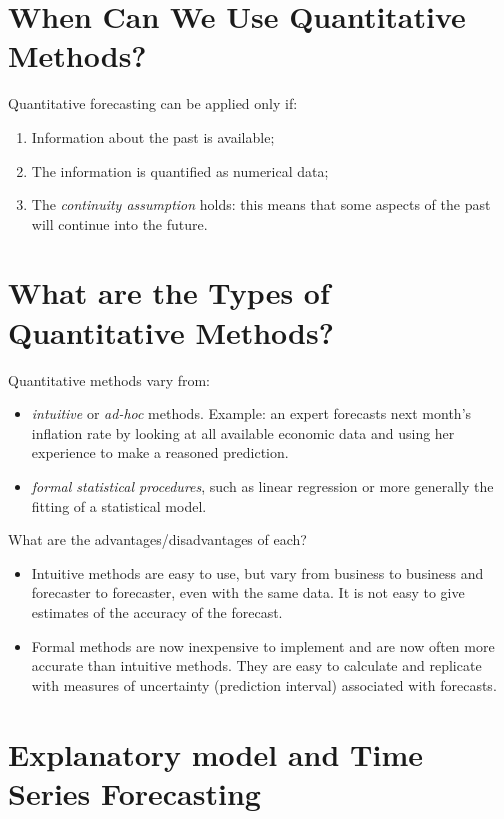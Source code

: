 \documentclass[a4paper,11pt,oneside,onecolumn]{book}
\begin{document}
\vspace{.5cm}

\section{When Can We Use Quantitative Methods?}
\noindent Quantitative forecasting can be applied only if:
\begin{enumerate}
\item Information about the past is available;
\item The information is quantified as numerical data;
\item The {\it continuity assumption} holds: this means that some
aspects of the past will continue into the future.
\end{enumerate}

\section{What are the Types of Quantitative Methods?}
\noindent Quantitative methods vary from: \begin{itemize}
\item {\it intuitive} or {\it ad-hoc} methods. Example: an expert forecasts next month's
inflation rate by looking at all available economic data and using
her experience to make a reasoned prediction.
\item {\it formal statistical procedures}, such as linear
regression or more generally the fitting of a statistical model.
\end{itemize}

\noindent What are the advantages/disadvantages of each?
\begin{itemize}
\item Intuitive methods are easy to use, but vary from business to
business and forecaster to forecaster, even with the same data. It
is not easy to give estimates of the accuracy of the forecast.
\item Formal methods are now inexpensive to implement and are now
often more accurate than intuitive methods. They are easy to calculate and replicate with measures of uncertainty (prediction interval) associated with forecasts.
\end{itemize}


\section{Explanatory model and Time Series Forecasting}
\end{document}

